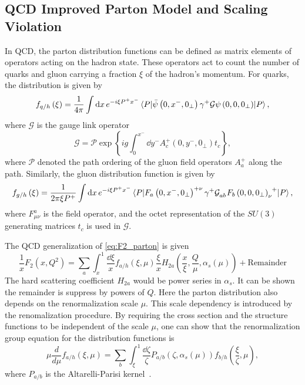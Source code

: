 \documentclass[../main.tex]{subfiles}
\begin{document}
\subsection{QCD Improved Parton Model and Scaling Violation}
\label{subsec:scaling_violation}
In QCD, the parton distribution functions can be defined as matrix elements of
operators acting on the hadron state. These operators act to count the number of
quarks and gluon carrying a fraction $\xi$ of the hadron's momentum. For quarks,
the distribution is given by~\cite{collins1989}
\begin{equation}
	f_{q/h}\left(\xi\right) = \frac{1}{4\pi}\int \dd{x} e^{-i\xi P^{+} x^{-}} \mel{P}{\bar{\psi}\left(0,x^-,0_\perp\right)\gamma^+ \mathcal{G} \psi\left(0,0,0_\perp\right)}{P},
\end{equation}
where $\mathcal{G}$ is the gauge link operator
\begin{equation}
	\mathcal{G}=\mathcal{P} \exp \left\{ ig\int_0^{x^-}\dd{y^-} A_c^+ \left(0,y^-,0_\perp\right)t_c\right\},
\end{equation}
where $\mathcal{P}$ denoted the path ordering of the gluon field operators $A_a^+$
along the path. Similarly, the gluon distribution function is given by
\begin{equation}
	f_{g/h}\left(\xi\right) = \frac{1}{2\pi\xi P^+}\int \dd{x} e^{-i\xi P^{+} x^{-}} \mel{P}{\tensor{F_a\left(0,x^-,0_\perp\right)}{^+^\nu}\gamma^{+} \tensor{\mathcal{G}}{_a_b} \tensor{F_b\left(0,0,0_\perp\right)}{_\nu^+}}{P},
\end{equation}
where $F^a_{\mu\nu}$ is the field operator, and the octet representation of the $SU(3)$
generating matrices $t_c$ is used in $\mathcal{G}$.

The QCD generalization of \cref{eq:F2_parton} is given
\begin{equation}
	\frac{1}{x}F_2\left(x,Q^2\right) = \sum_a \int_x^1 \frac{\dd{\xi}}{x}f_{a/h}\left(\xi,\mu\right)\frac{\xi}{x}H_{2a}\left( \frac{x}{\xi}, \frac{Q}{\mu}, \alpha_s\left(\mu\right)\right)
	+ \text{Remainder}
\end{equation}
The hard scattering coefficient $H_{2a}$ would be power series in $\alpha_s$. It
can be shown the remainder is suppress by powers of $Q$. Here the parton
distribution also depends on the renormalization scale $\mu$. This scale
dependency is introduced by the renomalization procedure. By requiring the cross
section and the structure functions to be independent of the scale $\mu$,
one can show that the renormalization group equation for the distribution
functions is
\begin{equation}
	\mu\frac{d}{d\mu}f_{a/h}\left(\xi,\mu\right)=\sum_b \int_\xi^1 \frac{\dd{\zeta}}{\zeta} P_{a/b}\left(\zeta,\alpha_s\left(\mu\right)\right) f_{b/h}\left(\frac{\xi}{\zeta},\mu\right),
\end{equation}
where $P_{a/b}$ is the Altarelli-Parisi kernel~\cite{altarelli1977}.
\end{document}
